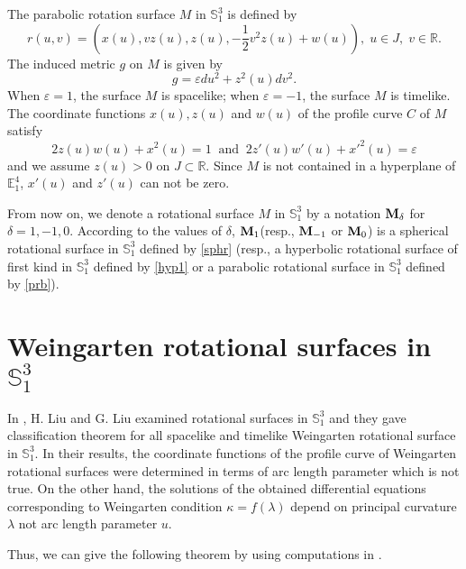 \documentclass{amsart}
\theoremstyle{definition}
\numberwithin{equation}{section}
\begin{document}
The parabolic rotation surface $M$ in $\mathbb{S}^3_1$ 
is defined by
\begin{equation}
\label{prb}
    r(u,v)=\left(x(u),vz(u),z(u),-\frac{1}{2}v^2z(u)+w(u)
    \right),\;u\in J,\; v\in\mathbb{R}.
\end{equation}
The induced metric 
$g$ on $M$ is given by 
\begin{equation}
    g=\varepsilon du^2+z^2(u)dv^2.
\end{equation}
When $\varepsilon=1$, the surface $M$ is spacelike; when 
$\varepsilon=-1$, the surface $M$ is timelike. 
The coordinate functions $x(u), z(u)$ and $w(u)$ of the profile curve $C$ of $M$ satisfy
\begin{equation}
   2z(u)w(u)+x^2(u)=1\;\;\mbox{and}\;\;
    2z'(u)w'(u)+x'^2(u)=\varepsilon
\end{equation}
and we assume $z(u)>0$ on $J\subset\mathbb{R}$.
Since $M$ is not contained in a hyperplane of $\mathbb{E}^4_1$, $x'(u)$ and $z'(u)$ can not be zero. 

From now on, we denote a rotational surface $M$ in $\mathbb{S}^3_1$ by a notation 
${\bf M}_\delta$ for $\delta=1,-1,0$. 
According to the values of $\delta$,
${\bf M}_1$(resp., ${\bf M}_{-1}$ or ${\bf M}_0$) is a spherical rotational surface in $\mathbb{S}^3_1$ defined by \eqref{sphr}
(resp., a hyperbolic rotational surface of first kind in $\mathbb{S}^3_1$ defined by \eqref{hyp1} or 
a parabolic rotational surface in $\mathbb{S}^3_1$ defined by \eqref{prb}).


\section{Weingarten rotational surfaces in $\mathbb{S}^3_1$}
In \cite{LL}, H. Liu and G. Liu examined rotational surfaces in $\mathbb{S}^3_1$ and they gave classification theorem for all spacelike and timelike Weingarten rotational surface in $\mathbb{S}^3_1$. 
In their results, the coordinate functions of the profile curve 
of Weingarten rotational surfaces were determined in terms of arc length parameter which is not true. 
On the other hand, the solutions of the obtained differential equations corresponding to Weingarten condition $\kappa=f(\lambda)$ depend on 
principal curvature $\lambda$ not arc length parameter $u$. 

Thus, we can give the following theorem by using computations in \cite{LL}.
\end{document}
